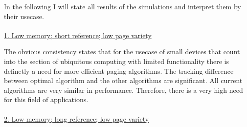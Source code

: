 \documentclass[12pt, reqno]{amsart}
\numberwithin{equation}{section}
\begin{document}
In the following I will state all results of the simulations and interpret them by their usecase. \\ \\


\underline{1. Low memory; short reference; low page variety} \\
\begin{center}
\end{center}

The obvious consistency states that for the usecase of small devices that count into the section of 
ubiquitous computing with limited functionality there is definetly a need for more efficient paging algorithms. The tracking difference
between optimal algorithm and the other algorithms are significant. All current algorithms are very similar in performance. Therefore, there is 
a very high need for this field of applications. \\ \\

\underline{2. Low memory; long reference; low page variety} \\
\begin{center}
\end{center}
\end{document}
